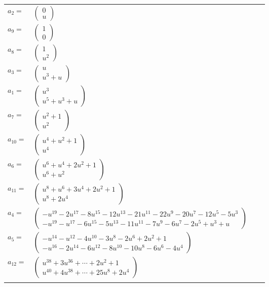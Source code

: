 \documentclass[1p]{elsarticle_modified}
\theoremstyle{definition}
\begin{document}
\begin{tabular}{m{7pt} m{180pt} m{7pt} m{180pt} }
\flushright $a_{2}=$&$\begin{pmatrix}0\\u\end{pmatrix}$ \\
\flushright $a_{9}=$&$\begin{pmatrix}1\\0\end{pmatrix}$ \\
\flushright $a_{8}=$&$\begin{pmatrix}1\\u^2\end{pmatrix}$ \\
\flushright $a_{3}=$&$\begin{pmatrix}u\\u^3+u\end{pmatrix}$ \\
\flushright $a_{1}=$&$\begin{pmatrix}u^3\\u^5+u^3+u\end{pmatrix}$ \\
\flushright $a_{7}=$&$\begin{pmatrix}u^2+1\\u^2\end{pmatrix}$ \\
\flushright $a_{10}=$&$\begin{pmatrix}u^4+u^2+1\\u^4\end{pmatrix}$ \\
\flushright $a_{6}=$&$\begin{pmatrix}u^6+u^4+2 u^2+1\\u^6+u^2\end{pmatrix}$ \\
\flushright $a_{11}=$&$\begin{pmatrix}u^8+u^6+3 u^4+2 u^2+1\\u^8+2 u^4\end{pmatrix}$ \\
\flushright $a_{4}=$&$\begin{pmatrix}- u^{19}-2 u^{17}-8 u^{15}-12 u^{13}-21 u^{11}-22 u^9-20 u^7-12 u^5-5 u^3\\- u^{19}- u^{17}-6 u^{15}-5 u^{13}-11 u^{11}-7 u^9-6 u^7-2 u^5+u^3+u\end{pmatrix}$ \\
\flushright $a_{5}=$&$\begin{pmatrix}- u^{14}- u^{12}-4 u^{10}-3 u^8-2 u^6+2 u^2+1\\- u^{16}-2 u^{14}-6 u^{12}-8 u^{10}-10 u^8-6 u^6-4 u^4\end{pmatrix}$ \\
\flushright $a_{12}=$&$\begin{pmatrix}u^{38}+3 u^{36}+\cdots+2 u^2+1\\u^{40}+4 u^{38}+\cdots+25 u^8+2 u^4\end{pmatrix}$\\&\end{tabular}
\end{document}

